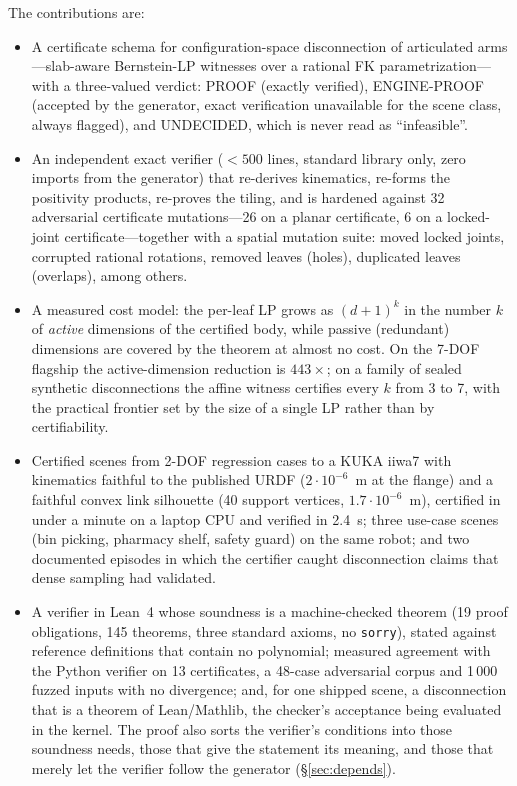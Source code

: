 \documentclass[10pt,twocolumn,letterpaper]{article}
\newif\ifhl \hlfalse  %
\newcommand{\new}[1]{\ifhl{\color{blue!65!black}#1}\else#1\fi}
\begin{document}
The contributions are:
\begin{itemize}
\item[\textbf{(C1)}] A certificate schema for configuration-space disconnection of articulated arms---slab-aware Bernstein-LP witnesses over a rational FK parametrization---with a three-valued verdict: PROOF (exactly verified), ENGINE-PROOF (accepted by the generator, exact verification unavailable for the scene class, always flagged), and UNDECIDED, which is never read as ``infeasible''.
\item[\textbf{(C2)}] An independent exact verifier ($<500$ lines, standard library only, zero imports from the generator) that re-derives kinematics, re-forms the positivity products, re-proves the tiling, and is hardened against 32 adversarial certificate mutations---26 on a planar certificate, 6 on a locked-joint certificate---together with a spatial mutation suite: moved locked joints, corrupted rational rotations, removed leaves (holes), duplicated leaves (overlaps), among others.
\item[\textbf{(C3)}] A measured cost model: the per-leaf LP grows as $(d+1)^k$ in the number $k$ of \emph{active} dimensions of the certified body, while passive (redundant) dimensions are covered by the theorem at almost no cost. On the 7-DOF flagship the active-dimension reduction is $443\times$; on a family of sealed synthetic disconnections the affine witness certifies every $k$ from 3 to 7, with the practical frontier set by the size of a single LP rather than by certifiability.
\item[\textbf{(C4)}] Certified scenes from 2-DOF regression cases to a KUKA iiwa7 with kinematics faithful to the published URDF ($2\cdot10^{-6}$~m at the flange) and a faithful convex link silhouette (40 support vertices, $1.7\cdot10^{-6}$~m), certified in under a minute on a laptop CPU and verified in 2.4~s; three use-case scenes (bin picking, pharmacy shelf, safety guard) on the same robot; and two documented episodes in which the certifier caught disconnection claims that dense sampling had validated.
\item[\textbf{(C5)}] \new{A verifier in Lean~4 whose soundness is a machine-checked theorem (19 proof obligations, 145 theorems, three standard axioms, no \texttt{sorry}), stated against reference definitions that contain no polynomial; measured agreement with the Python verifier on 13 certificates, a 48-case adversarial corpus and 1\,000 fuzzed inputs with no divergence; and, for one shipped scene, a disconnection that is a theorem of Lean/Mathlib, the checker's acceptance being evaluated in the kernel. The proof also sorts the verifier's conditions into those soundness needs, those that give the statement its meaning, and those that merely let the verifier follow the generator (\S\ref{sec:depends}).}
\end{itemize}
\end{document}
